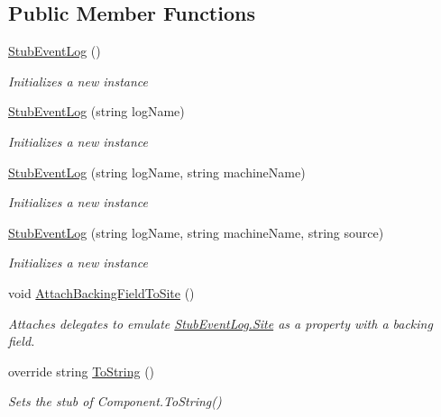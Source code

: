 \subsection*{Public Member Functions}
\begin{DoxyCompactItemize}
\item 
\hyperlink{class_system_1_1_diagnostics_1_1_fakes_1_1_stub_event_log_aa06ea7b60d70ae797aeca21b9cfc2cd6}{Stub\-Event\-Log} ()
\begin{DoxyCompactList}\small\item\em Initializes a new instance\end{DoxyCompactList}\item 
\hyperlink{class_system_1_1_diagnostics_1_1_fakes_1_1_stub_event_log_a65184a084b8649ee4e07a5ddbc3b79e5}{Stub\-Event\-Log} (string log\-Name)
\begin{DoxyCompactList}\small\item\em Initializes a new instance\end{DoxyCompactList}\item 
\hyperlink{class_system_1_1_diagnostics_1_1_fakes_1_1_stub_event_log_a56ef7c0442aecb36c4b61ee5318c10fe}{Stub\-Event\-Log} (string log\-Name, string machine\-Name)
\begin{DoxyCompactList}\small\item\em Initializes a new instance\end{DoxyCompactList}\item 
\hyperlink{class_system_1_1_diagnostics_1_1_fakes_1_1_stub_event_log_ae8cb7b8cb72a7a0c698248137bccac4e}{Stub\-Event\-Log} (string log\-Name, string machine\-Name, string source)
\begin{DoxyCompactList}\small\item\em Initializes a new instance\end{DoxyCompactList}\item 
void \hyperlink{class_system_1_1_diagnostics_1_1_fakes_1_1_stub_event_log_a892f50d4a297e859dbc49e45a1a47903}{Attach\-Backing\-Field\-To\-Site} ()
\begin{DoxyCompactList}\small\item\em Attaches delegates to emulate \hyperlink{class_system_1_1_diagnostics_1_1_fakes_1_1_stub_event_log_aaf1cde5d378e9722fc0c1d8677451fe4}{Stub\-Event\-Log.\-Site} as a property with a backing field.\end{DoxyCompactList}\item 
override string \hyperlink{class_system_1_1_diagnostics_1_1_fakes_1_1_stub_event_log_aa0c0a9d809066dd414462e1029463e27}{To\-String} ()
\begin{DoxyCompactList}\small\item\em Sets the stub of Component.\-To\-String()\end{DoxyCompactList}\end{DoxyCompactItemize}

